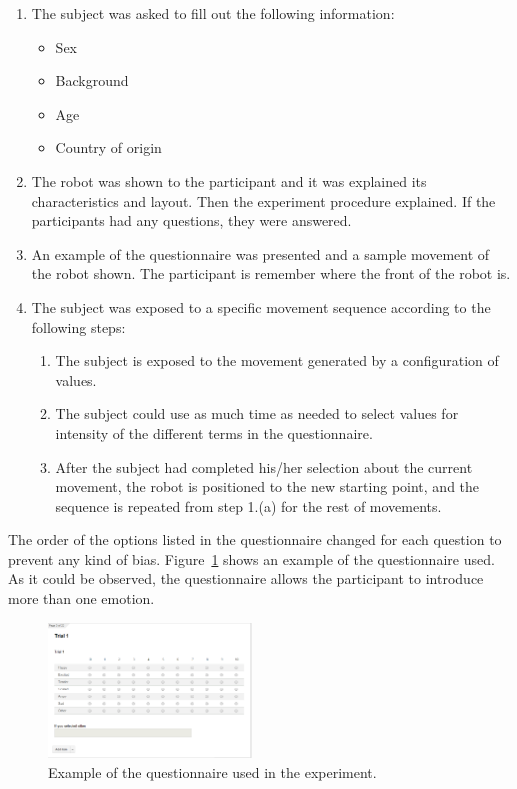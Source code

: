\begin{enumerate}
	
	\item The subject was asked to fill out the following information:
	
	\begin{itemize}
		\item Sex
		\item Background
		\item Age
		\item Country of origin
	\end{itemize}
	
	\item The robot was shown to the participant and it was explained its characteristics and layout. Then the experiment procedure explained. If the participants had any questions, they were answered.

	\item An example of the questionnaire was presented and a sample movement of the robot shown. The participant is remember where the front of the robot is.

	\item The subject was exposed to a specific movement sequence according to the following steps:

	\begin{enumerate}

		\item The subject is exposed to the movement generated by a configuration of values.

		\item The subject could use as much time as needed to select values for intensity of the different terms in the questionnaire.

		\item After the subject had completed his/her selection about the current movement, the robot is positioned to the new starting point, and the sequence is repeated from step 1.(a) for the rest of movements.

	\end{enumerate}
\end{enumerate}

The order of the options listed in the questionnaire changed for each question to prevent any kind of bias. Figure~\ref{fig:questionnaire_example} shows an example of the questionnaire used. As it could be observed, the questionnaire allows the participant to introduce more than one emotion.

\begin{figure}
	\centering
	\includegraphics[width=0.48\textwidth]{./Images/example_survey.png} 
	\caption{Example of the questionnaire used in the experiment.}
	\label{fig:questionnaire_example}
\end{figure}

